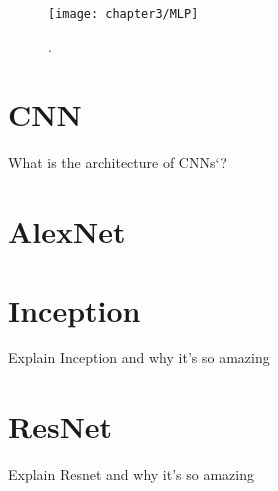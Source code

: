 \begin{figure}[H]
  \centering
  \caption{. \cite{cs231neuralnetworks}}
  \texttt{[image: chapter3/MLP]}
  \label{fig:MLP}
\end{figure}

\section{CNN}

What is the architecture of CNNs`?

\section{AlexNet}

\section{Inception}

Explain Inception and why it's so amazing

\section{ResNet}

Explain Resnet and why it's so amazing
